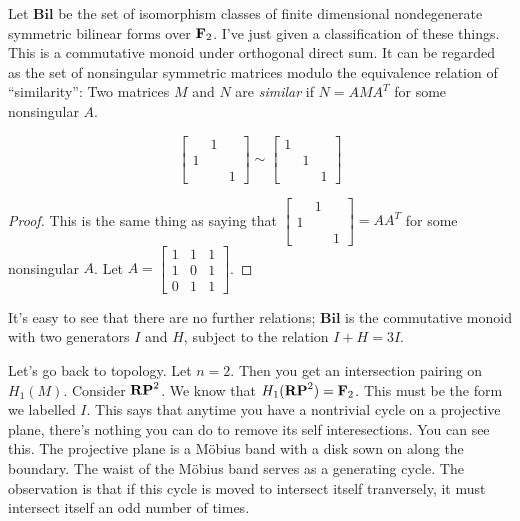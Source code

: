Let $\mathbf{Bil}$ be the set of isomorphism classes of finite dimensional 
nondegenerate symmetric bilinear forms over $\mathbf F_2$. I've just given a classification of these things. This is a commutative monoid under orthogonal
direct sum. It can be
regarded as the set of nonsingular symmetric matrices modulo the equivalence
relation of ``similarity'': Two matrices $M$ and $N$ are {\em similar} if  
$N=AMA^T$ for some nonsingular $A$.
\begin{claim}
\begin{equation*}
\left[\begin{array}{ccc}
 & 1 & \\
1 & & \\
 & & 1
\end{array}\right]
\sim
\left[\begin{array}{ccc}
1 & & \\
& 1 & \\
& & 1
\end{array}\right]
\end{equation*}
\end{claim}
\begin{proof}
This is the same thing as saying that 
$\left[\begin{array}{ccc} & 1 & \\ 1 & & \\ & & 1\end{array}\right]=AA^T$ 
for some nonsingular $A$. Let 
$
A=\left[\begin{array}{ccc}1&1&1 \\ 1&0&1 \\ 0&1&1 \end{array}\right]$.
\end{proof}
It's easy to see that there are no further relations; 
$\mathbf{Bil}$ is the commutative monoid with two generators $I$ and $H$, 
subject to the relation $I+H=3I$. 

Let's go back to topology. Let $n=2$. Then you get an intersection pairing on $ H_1(M)$. Consider $\mathbf{RP}^2$. We know that $ H_1(\mathbf{RP}^2)=\mathbf F_2$. This must be the form we labelled $I$. This says that anytime you have a nontrivial cycle on a projective plane, there's nothing you can do to remove its self interesections. You can see this. The projective plane is a M\"obius band with a 
disk sown on along the boundary. The waist of the M\"obius band serves as a
generating cycle. The observation is that if this cycle is moved to intersect 
itself tranversely, it must intersect itself an odd number of times. 

